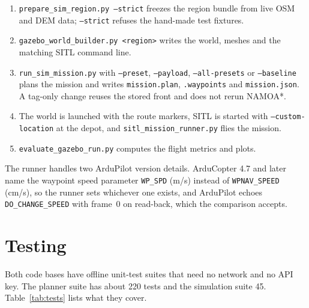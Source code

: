 \documentclass{ssnreview}
\begin{document}
\begin{enumerate}[label=\arabic*.]
  \item \texttt{prepare\_sim\_region.py --strict} freezes the region bundle from live OSM
  and DEM data; \texttt{--strict} refuses the hand-made test fixtures.
  \item \texttt{gazebo\_world\_builder.py <region>} writes the world, meshes and the
  matching SITL command line.
  \item \texttt{run\_sim\_mission.py} with \texttt{--preset}, \texttt{--payload},
  \texttt{--all-presets} or \texttt{--baseline} plans the mission and writes
  \texttt{mission.plan}, \texttt{.waypoints} and \texttt{mission.json}. A tag-only change
  reuses the stored front and does not rerun NAMOA*.
  \item The world is launched with the route markers, SITL is started with
  \texttt{--custom-location} at the depot, and \texttt{sitl\_mission\_runner.py} flies the
  mission.
  \item \texttt{evaluate\_gazebo\_run.py} computes the flight metrics and plots.
\end{enumerate}

The runner handles two ArduPilot version details. ArduCopter 4.7 and later name the
waypoint speed parameter \texttt{WP\_SPD} (m/s) instead of \texttt{WPNAV\_SPEED} (cm/s), so the
runner sets whichever one exists, and ArduPilot echoes \texttt{DO\_CHANGE\_SPEED}
with frame~0 on read-back, which the comparison accepts.

\section{Testing}

Both code bases have offline unit-test suites that need no network and no API key. The
planner suite has about 220 tests and the simulation suite 45.
Table~\ref{tab:tests} lists what they cover.
\end{document}
